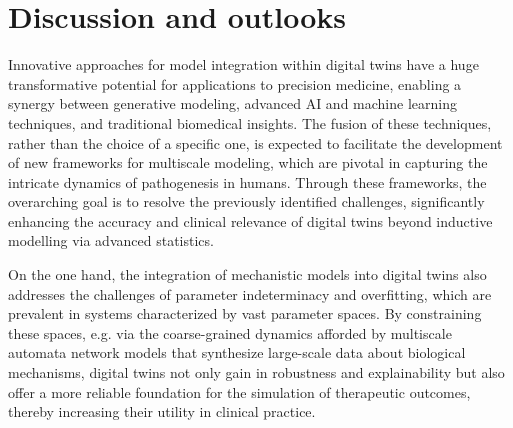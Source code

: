 \documentclass[12pt]{article}
\renewcommand{\(}{\left(}
\renewcommand{\)}{\right)}
\renewcommand{\[}{\left[}
\renewcommand{\]}{\right]}
\begin{document}
\section*{Discussion and outlooks}

Innovative approaches for model integration within digital twins have a huge transformative potential for applications to precision medicine, enabling a synergy between generative modeling, advanced AI and machine learning techniques, and traditional biomedical insights. The fusion of these techniques, rather than the choice of a specific one, is expected to facilitate the development of new frameworks for multiscale modeling, which are pivotal in capturing the intricate dynamics of pathogenesis in humans. Through these frameworks, the overarching goal is to resolve the previously identified challenges, significantly enhancing the accuracy and clinical relevance of digital twins beyond inductive modelling via advanced statistics.

On the one hand, the integration of mechanistic models into digital twins also addresses the challenges of parameter indeterminacy and overfitting, which are prevalent in systems characterized by vast parameter spaces. By constraining these spaces, e.g. via the coarse-grained dynamics afforded by multiscale automata network models that synthesize large-scale data about biological mechanisms, digital twins not only gain in robustness and explainability but also offer a more reliable foundation for the simulation of therapeutic outcomes, thereby increasing their utility in clinical practice.
\end{document}

